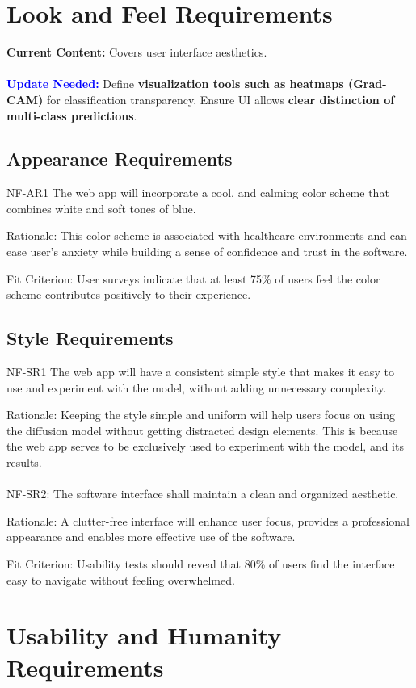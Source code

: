 \documentclass[12pt]{article}
\begin{document}
\section{Look and Feel Requirements}

\textbf{Current Content:} Covers user interface aesthetics. \\
\\
\textbf{\textcolor{blue}{Update Needed:}} Define \textbf{visualization tools such as heatmaps (Grad-CAM)} for classification transparency. Ensure UI allows \textbf{clear distinction of multi-class predictions}.

\subsection{Appearance Requirements}
NF-AR1 The web app will incorporate a cool, and calming color scheme that combines white and soft 
tones of blue.

Rationale: This color scheme is associated with healthcare environments and can ease user’s 
anxiety while building a sense of confidence and trust in the software.

Fit Criterion: User surveys indicate that at least 75\% of users feel the color scheme contributes 
positively to their experience.

\subsection{Style Requirements}
NF-SR1 The web app will have a consistent simple style that makes it easy to use and experiment 
with the model, without adding unnecessary complexity.

Rationale: Keeping the style simple and uniform will help users focus on using the diffusion model 
without getting distracted design elements. This is because the web app serves to be exclusively 
used to experiment with the model, and its results. 
\\\\
NF-SR2: The software interface shall maintain a clean and organized aesthetic.

Rationale: A clutter-free interface will enhance user focus, provides a professional appearance 
and enables more effective use of the software.

Fit Criterion: Usability tests should reveal that 80\% of users find the interface easy to 
navigate without feeling overwhelmed.

\section{Usability and Humanity Requirements}
\end{document}
